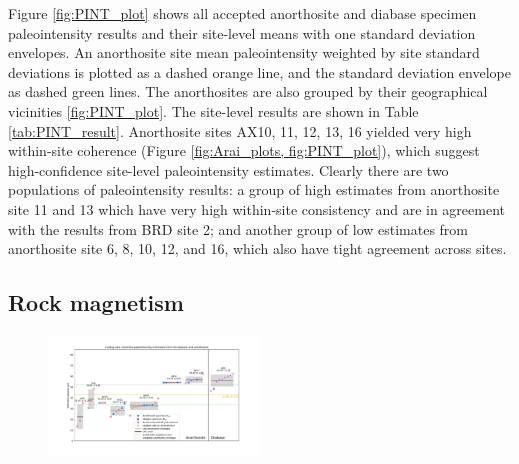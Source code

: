 \documentclass[draft]{agujournal2019}
\begin{document}
Figure \ref{fig:PINT_plot} shows all accepted anorthosite and diabase specimen paleointensity results and their site-level means with one standard deviation envelopes. An anorthosite site mean paleointensity weighted by site standard deviations is plotted as a dashed orange line, and the standard deviation envelope as dashed green lines. The anorthosites are also grouped by their geographical vicinities \ref{fig:PINT_plot}. The site-level results are shown in Table \ref{tab:PINT_result}. Anorthosite sites AX10, 11, 12, 13, 16 yielded very high within-site coherence (Figure \ref{fig:Arai_plots, fig:PINT_plot}), which suggest high-confidence site-level paleointensity estimates. Clearly there are two populations of paleointensity results: a group of high estimates from anorthosite site 11 and 13 which have very high within-site consistency and are in agreement with the results from BRD site 2; and another group of low estimates from anorthosite site 6, 8, 10, 12, and 16, which also have tight agreement across sites.

\subsection*{Rock magnetism}
\begin{figure}[h!]
\noindent\includegraphics[width=0.5\textwidth]{manuscript/Paleointensity_plot_cooling_corrected.pdf}
\centering
\caption{\small{ }}
\label{fig:PINT_cooling_corrected}
\end{figure}





\end{document}
